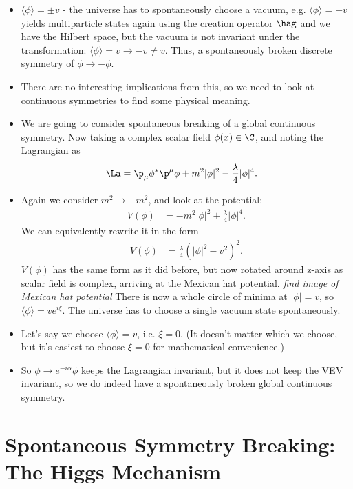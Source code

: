 \documentclass[a4paper, 11pt, normalem]{report}
\begin{document}
\begin{itemize}
\begin{figure}[H]
\begin{tikzpicture}
            \end{tikzpicture}
        \end{figure}
    \item $\langle\phi\rangle=\pm v$ - the universe has to spontaneously choose a vacuum, e.g. $\langle\phi\rangle=+v$ yields multiparticle states again using the creation operator $\hag$ and we have the Hilbert space, but the vacuum is not invariant under the transformation: $\langle\phi\rangle=v\to-v\neq v$.
        Thus, a spontaneously broken discrete symmetry of $\phi\to-\phi$.
    \item There are no interesting implications from this, so we need to look at continuous symmetries to find some physical meaning.
    \item We are going to consider spontaneous breaking of a global continuous symmetry.
        Now taking a complex scalar field $\phi(x)\in\C$, and noting the Lagrangian as
        \begin{align}
            \La &= \p_\mu\phi^*\p^\mu\phi + m^2|\phi|^2 - \frac{\lambda}{4}|\phi|^4.
        \end{align}
    \item Again we consider $m^2\to-m^2$, and look at the potential:
        \begin{align}
            V(\phi) &= -m^2|\phi|^2 + \frac{\lambda}{4}|\phi|^4.
        \end{align}
        We can equivalently rewrite it in the form
        \begin{align}
            V(\phi) &= \frac{\lambda}{4}\left(|\phi|^2-v^2\right)^2.
        \end{align}
        $V(\phi)$ has the same form as it did before, but now rotated around z-axis as scalar field is complex, arriving at the Mexican hat potential.
        \emph{find image of Mexican hat potential}
        There is now a whole circle of minima at $|\phi|=v$, so $\langle\phi\rangle = ve^{i\xi}$.
        The universe has to choose a single vacuum state spontaneously.
    \item Let's say we choose $\langle\phi\rangle = v$, i.e. $\xi=0$. (It doesn't matter which we choose, but it's easiest to choose $\xi=0$ for mathematical convenience.)
    \item So $\phi\to e^{-i\alpha}\phi$ keeps the Lagrangian invariant, but it does not keep the VEV invariant, so we do indeed have a spontaneously broken global continuous symmetry.
\end{itemize}

\chapter{Spontaneous Symmetry Breaking: The Higgs Mechanism}
\end{document}
